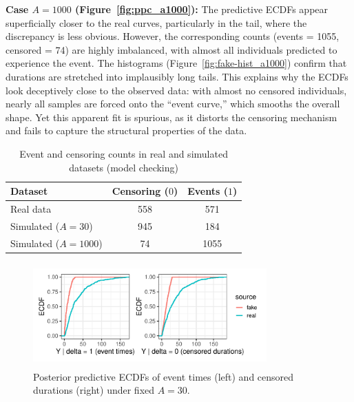 \textbf{Case $A=1000$ (Figure~\ref{fig:ppc_a1000}):} The predictive ECDFs appear superficially closer to the real curves, particularly in the tail, where the discrepancy is less obvious. However, the corresponding counts (events = 1055, censored = 74) are highly imbalanced, with almost all individuals predicted to experience the event. The histograms (Figure~\ref{fig:fake-hist_a1000}) confirm that durations are stretched into implausibly long tails. This explains why the ECDFs look deceptively close to the observed data: with almost no censored individuals, nearly all samples are forced onto the “event curve,” which smooths the overall shape. Yet this apparent fit is spurious, as it distorts the censoring mechanism and fails to capture the structural properties of the data.

\begin{table}[H]
\centering
\caption{{\small Event and censoring counts in real and simulated datasets (model checking)}}
\label{tab:modelcheck_counts}
\small  
\begin{tabular}{lcc}
\toprule
\textbf{Dataset} & \textbf{Censoring ($0$)} & \textbf{Events ($1$)} \\
\midrule
Real data        & 558  & 571  \\
Simulated ($A=30$)   & 945  & 184  \\
Simulated ($A=1000$) & 74   & 1055 \\
\bottomrule
\end{tabular}
\end{table}

\begin{figure}[H]
    \centering
    \includegraphics[height=4cm, width=0.8\textwidth]{images/ppc_two_a30.pdf}
    \caption{{\small Posterior predictive ECDFs of event times (left) and censored durations (right) under fixed $A=30$.}}
    \label{fig:ppc_a30}
\end{figure}

